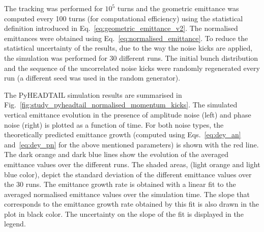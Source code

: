 The tracking was performed for $10^5$ turns and the geometric emittance was computed every 100 turns (for computational efficiency) using the statistical definition introduced in Eq.~\eqref{eq:geometric_emittance_v2}. The normalised emittances were obtained using Eq.~\eqref{eq:normalised_emittance}. To reduce the statistical uncertainty of the results, due to the way the noise kicks are applied, the simulation was performed for 30 different runs. The initial bunch distribution and the sequence of the uncorrelated noise kicks were randomly regenerated every run (a different seed was used in the random generator).

The PyHEADTAIL simulation results are summarised in Fig.~\ref{fig:study_pyheadtail_normalised_momentum_kicks}. The simulated vertical emittance evolution in the presence of amplitude noise (left) and phase noise (right) is plotted as a function of time. For both noise types, the theoretically predicted emittance growth (computed using Eqs.~\eqref{eq:dey_an} and~\eqref{eq:dey_pn} for the above mentioned parameters) is shown with the red line. The dark orange and dark blue lines show the evolution of the averaged emittance values over the different runs. The shaded areas, (light orange and light blue color), depict the standard deviation of the different emittance values over the 30 runs. The emittance growth rate is obtained with a linear fit to the averaged normalised emittance values over the simulation time. The slope that corresponds to the emittance growth rate obtained by this fit is also drawn in the plot in black color. The uncertainty on the slope of the fit is displayed in the legend.

